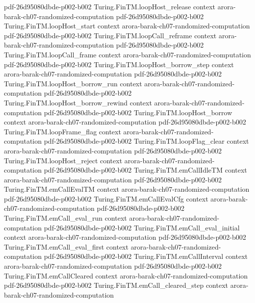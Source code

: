 \begin{theorem}
  {pdf-26d95080dbde-p002-b002}
\proofstep
  {Turing.FinTM.loopHost_release}
  {context}
  {arora-barak-ch07-randomized-computation}
  {pdf-26d95080dbde-p002-b002}
\proofstep
  {Turing.FinTM.loopHost_start}
  {context}
  {arora-barak-ch07-randomized-computation}
  {pdf-26d95080dbde-p002-b002}
\proofstep
  {Turing.FinTM.loopCall_reframe}
  {context}
  {arora-barak-ch07-randomized-computation}
  {pdf-26d95080dbde-p002-b002}
\proofstep
  {Turing.FinTM.loopCall_frame}
  {context}
  {arora-barak-ch07-randomized-computation}
  {pdf-26d95080dbde-p002-b002}
\proofstep
  {Turing.FinTM.loopHost_borrow_step}
  {context}
  {arora-barak-ch07-randomized-computation}
  {pdf-26d95080dbde-p002-b002}
\proofstep
  {Turing.FinTM.loopHost_borrow_run}
  {context}
  {arora-barak-ch07-randomized-computation}
  {pdf-26d95080dbde-p002-b002}
\proofstep
  {Turing.FinTM.loopHost_borrow_rewind}
  {context}
  {arora-barak-ch07-randomized-computation}
  {pdf-26d95080dbde-p002-b002}
\proofstep
  {Turing.FinTM.loopHost_borrow}
  {context}
  {arora-barak-ch07-randomized-computation}
  {pdf-26d95080dbde-p002-b002}
\proofstep
  {Turing.FinTM.loopFrame_flag}
  {context}
  {arora-barak-ch07-randomized-computation}
  {pdf-26d95080dbde-p002-b002}
\proofstep
  {Turing.FinTM.loopFlag_clear}
  {context}
  {arora-barak-ch07-randomized-computation}
  {pdf-26d95080dbde-p002-b002}
\proofstep
  {Turing.FinTM.loopHost_reject}
  {context}
  {arora-barak-ch07-randomized-computation}
  {pdf-26d95080dbde-p002-b002}
\proofstep
  {Turing.FinTM.emCallIdleTM}
  {context}
  {arora-barak-ch07-randomized-computation}
  {pdf-26d95080dbde-p002-b002}
\proofstep
  {Turing.FinTM.emCallEvalTM}
  {context}
  {arora-barak-ch07-randomized-computation}
  {pdf-26d95080dbde-p002-b002}
\proofstep
  {Turing.FinTM.emCallEvalCfg}
  {context}
  {arora-barak-ch07-randomized-computation}
  {pdf-26d95080dbde-p002-b002}
\proofstep
  {Turing.FinTM.emCall_eval_run}
  {context}
  {arora-barak-ch07-randomized-computation}
  {pdf-26d95080dbde-p002-b002}
\proofstep
  {Turing.FinTM.emCall_eval_initial}
  {context}
  {arora-barak-ch07-randomized-computation}
  {pdf-26d95080dbde-p002-b002}
\proofstep
  {Turing.FinTM.emCall_eval_first}
  {context}
  {arora-barak-ch07-randomized-computation}
  {pdf-26d95080dbde-p002-b002}
\proofstep
  {Turing.FinTM.emCallInterval}
  {context}
  {arora-barak-ch07-randomized-computation}
  {pdf-26d95080dbde-p002-b002}
\proofstep
  {Turing.FinTM.emCallCleared}
  {context}
  {arora-barak-ch07-randomized-computation}
  {pdf-26d95080dbde-p002-b002}
\proofstep
  {Turing.FinTM.emCall_cleared_step}
  {context}
  {arora-barak-ch07-randomized-computation}

\end{theorem}
